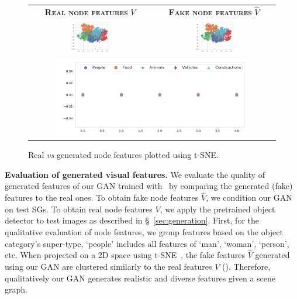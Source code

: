 \begin{figure}[t]
\centering
\footnotesize
\setlength{\tabcolsep}{6pt}
\begin{tabular}{cc}
      \textbf{\textsc{Real node features}} $V$ & \textbf{\textsc{Fake node features}} $\hat{V}$\vspace{1pt}\\
     \includegraphics[width=0.35\textwidth]{tsne_gan_nodes_test_zs_real.pdf} & \includegraphics[width=0.35\textwidth]{tsne_gan_nodes_test_zs_fake.pdf}\vspace{-5pt}\\
     \multicolumn{2}{c}{{\includegraphics[width=0.8\textwidth, trim={3cm 8.5cm 0.5cm 0.6cm}, clip]{tsne_gan_nodes_test_zs_legend.pdf}}}
     \vspace{-5pt}
\end{tabular}
  \caption{\small Real \textit{vs} generated node features plotted using t-SNE.}
\label{fig:tsne}
\end{figure}

\textbf{Evaluation of generated visual features.}
We evaluate the quality of generated features of our GAN trained with \structn~by comparing the generated (fake) features to the real ones. To obtain fake node features $\hat{V}$, we condition our GAN on test SGs. To obtain real node features $V$, we apply the pretrained object detector to test images as described in \S~\ref{sec:generation}.
First, for the qualitative evaluation of node features, we group features based on the object category's super-type, \eg `people' includes all features of `man', `woman', `person', etc. When projected on a 2D space using t-SNE~\citep{van2008visualizing}, the fake features $\hat{V}$ generated using our GAN are clustered similarly to the real features $V$ (\fig{\ref{fig:tsne}}). Therefore, qualitatively our GAN generates realistic and diverse features given a scene graph.

